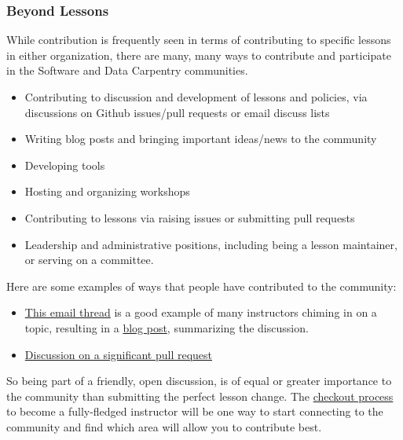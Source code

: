 \subsubsection{Beyond Lessons}\label{beyond-lessons}

While contribution is frequently seen in terms of contributing to
specific lessons in either organization, there are many, many ways to
contribute and participate in the Software and Data Carpentry
communities.

\begin{itemize}
\itemsep1pt\parskip0pt
\item
  Contributing to discussion and development of lessons and policies,
  via discussions on Github issues/pull requests or email discuss lists
\item
  Writing blog posts and bringing important ideas/news to the community
\item
  Developing tools
\item
  Hosting and organizing workshops
\item
  Contributing to lessons via raising issues or submitting pull requests
\item
  Leadership and administrative positions, including being a lesson
  maintainer, or serving on a committee.
\end{itemize}

Here are some examples of ways that people have contributed to the
community:

\begin{itemize}
\itemsep1pt\parskip0pt
\item
  \href{http://lists.software-carpentry.org/pipermail/discuss/2015-October/003396.html}{This
  email thread} is a good example of many instructors chiming in on a
  topic, resulting in a
  \href{http://software-carpentry.org/blog/2015/10/pulling-along-those-behind.html}{blog
  post}, summarizing the discussion.
\item
  \href{https://github.com/swcarpentry/r-novice-gapminder/pull/89}{Discussion
  on a significant pull request}
\end{itemize}

So being part of a friendly, open discussion, is of equal or greater
importance to the community than submitting the perfect lesson change.
The \href{\{\{\%20page.root\%20\}\}/checkout/}{checkout process} to
become a fully-fledged instructor will be one way to start connecting to
the community and find which area will allow you to contribute best.

